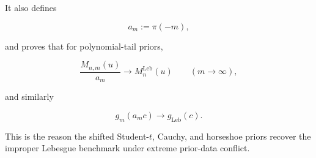 \documentclass{article}%
\begin{document}
It also defines

\[
a_m := \pi(-m),
\]

and proves that for polynomial-tail priors,

\[
\frac{M_{n,m}(u)}{a_m}\to M_n^{\mathrm{Leb}}(u)
\qquad (m\to\infty),
\]

and similarly

\[
g_m(a_m c)\to g_{\mathrm{Leb}}(c).
\]

This is the reason the shifted Student-\(t\), Cauchy, and horseshoe priors recover the improper Lebesgue benchmark under extreme prior-data conflict.

















\end{document}
